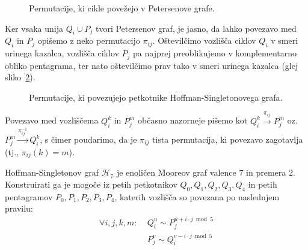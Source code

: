 \documentclass[fin1, tisk]{fmfdelo}
\newcommand{\hof}{\mathscr{H}_{7}}
\begin{document}
\begin{figure}[ht]
    \centering
    \def\svgwidth{\columnwidth}
    \caption{Permutacije, ki cikle povežejo v Petersenove grafe.}
    \label{fig:hoffman_4}
\end{figure}

\begin{opomba}
Ker vsaka unija $Q_i \cup P_j$ tvori Petersenov graf, 
je jasno, da lahko povezavo med $Q_i$ in $P_j$ opišemo z neko permutacijo 
$\pi_{ij}$. Oštevilčimo vozlišča ciklov $Q_i$ v smeri urinega kazalca, vozlišča ciklov $P_j$ pa 
najprej preoblikujemo v komplementarno obliko pentagrama, ter nato oštevilčimo prav 
tako v smeri urinega kazalca (glej sliko~\ref{fig:hoffman_permutacije}). 
\end{opomba}

\begin{figure}[ht]
    \centering
    \def\svgwidth{\columnwidth}
    \caption{Permutacije, ki povezujejo petkotnike Hoffman-Singletonovega grafa.}
    \label{fig:hoffman_permutacije}
\end{figure}

\begin{opomba}
    Povezavo med vozliščema $Q_i^k$ in $P_j^m$ občasno nazorneje pišemo kot 
    $Q_i^k \overset{\pi_{ij}}{\rightarrow} P_j^m$ oz.~$P_j^m \overset{\pi_{ij}^{-1}}{\rightarrow} Q_i^k$, 
    s čimer poudarimo, da je $\pi_{ij}$ tista permutacija, ki povezavo zagotavlja (tj., $\pi_{ij}(k) = m$).
\end{opomba}

\begin{izrek}\label{iz:sosedstva_ciklov}
    Hoffman-Singletonov graf $\hof$ je enoličen Mooreov graf valence $7$ in premera $2$. Konstruirati
    ga je mogoče iz petih petkotnikov $Q_0, Q_1, Q_2, Q_3, Q_4$ in petih pentagramov $P_0, P_1, P_2, P_3, P_4$, 
    katerih vozlišča so povezana po naslednjem pravilu:
        \begin{align*}
        \forall i, j, k, m:\; &Q^u_i \sim P_j^{u + i\cdot j \bmod{5}} \\
        &P^v_j \sim Q_i^{v - i\cdot j \bmod{5}}
    \end{align*}
\end{izrek}
\end{document}
